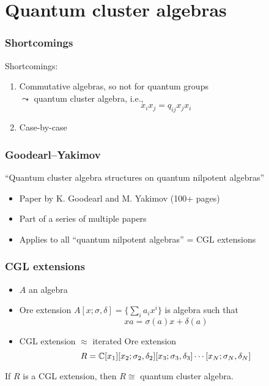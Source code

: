 \documentclass[aspectratio=169]{beamer}
\begin{document}
\section{Quantum cluster algebras}

\begin{frame}
	\frametitle{Shortcomings}

	Shortcomings:
	\begin{enumerate}
		\item Commutative algebras, so not for quantum groups\\ \pause $\leadsto$ quantum cluster
		      algebra, i.e.,
		      \begin{equation*}
			      x_i x_j = q_{ij} x_j x_i
		      \end{equation*}%
		      \pause
		\item Case-by-case
	\end{enumerate}

\end{frame}

\begin{frame}
	\frametitle{Goodearl--Yakimov}

	\begin{center}
		``Quantum cluster algebra structures on quantum nilpotent algebras''
	\end{center}
	\begin{itemize}
		\item Paper by K. Goodearl and M. Yakimov (100+ pages)
		\item Part of a series of multiple papers
		\item Applies to all ``quantum nilpotent algebras'' = CGL extensions
	\end{itemize}

\end{frame}

\begin{frame}
	\frametitle{CGL extensions}
	\begin{itemize}
		\item $A$ an algebra
		\item Ore extension $A[x; \sigma, \delta] = \{\sum_i a_i x^i\}$ is algebra such that
		      \begin{equation*}
			      x a = \sigma(a) x + \delta(a)
		      \end{equation*}
		\item CGL extension $\approx$ iterated Ore extension
		      \begin{equation*}
			      R = \mathbb{C}[x_1][x_2; \sigma_2, \delta_2][x_3; \sigma_3, \delta_3] \dotsb [x_N; \sigma_N, \delta_N]
		      \end{equation*}
	\end{itemize}
	\begin{theorem}
		If $R$ is a CGL extension, then $R \cong$ quantum cluster algebra.
	\end{theorem}

\end{frame}
\end{document}
